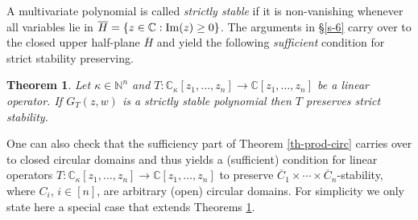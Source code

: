 \documentclass[10pt,reqno]{amsart}
\theoremstyle{plain}
\newtheorem{theorem}{Theorem}[section]
\newtheorem{proposition}[theorem]{Proposition}
\theoremstyle{definition}
\theoremstyle{remark}
\numberwithin{equation}{section}
\newcommand{\NN}{\mathbb{N}}
\newcommand{\bH}{\mathbb{H}}
\newcommand{\RR}{\mathbb{R}}
\newcommand{\CC}{\mathbb{C}}
\newcommand{\te}{\theta}
\renewcommand{\Im}{{\rm Im}}
\begin{document}




A multivariate polynomial is called {\em strictly stable} if it is 
non-vanishing whenever all variables lie in 
$\overline{H}=\{z\in\CC:\Im(z)\ge 0\}$. The arguments in \S \ref{s-6} 
carry over to the closed upper half-plane $\overline{H}$ and yield the 
following {\em sufficient} condition for strict stability preserving.

\begin{theorem}\label{th-strict}
Let $\kappa \in \NN^n$ and $T : \CC_\kappa[z_1,\ldots, z_n] \rightarrow 
\CC[z_1,\ldots, z_n]$ be a linear operator. If $G_T(z,w)$ is a strictly stable
polynomial then $T$ preserves strict stability. 
\end{theorem}

One can also check that the sufficiency part of Theorem \ref{th-prod-circ} 
carries over to closed circular domains and thus yields a (sufficient) 
condition for linear operators $T : \CC_\kappa[z_1,\ldots, z_n] \rightarrow 
\CC[z_1,\ldots, z_n]$ to preserve 
$\overline{C}_1\times\cdots\times\overline{C}_n$-stability, where
$C_i$, $i\in [n]$, are arbitrary (open) circular domains. For simplicity we 
only state
here a special case that extends Theorems \ref{th-strict}.
\end{document}

